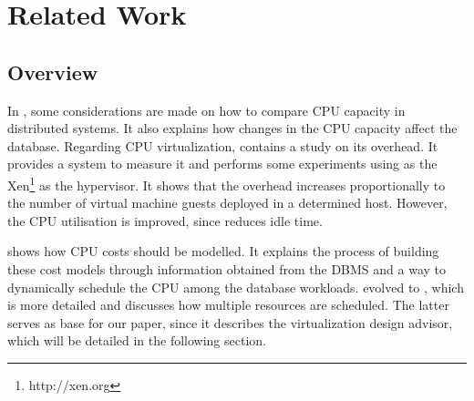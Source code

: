 \chapter{\textbf{Related Work}}

\section{Overview}


\label{chap:relwork}

In \cite{dias:automatic}, some considerations are made on how to compare CPU capacity in distributed systems. It also explains how changes in the CPU capacity affect the database. Regarding CPU virtualization, \cite{6127969} contains a study on its overhead. It provides a system to measure it and performs some experiments using as the Xen\footnote{http://xen.org} as the hypervisor. It shows that the overhead increases proportionally to the number of virtual machine guests deployed in a determined host. However, the CPU utilisation is improved, since reduces idle time. 

\cite{Soror:2008:AVM:1376616.1376711-OLD} shows how CPU costs should be modelled. It explains the process of building these cost models through information obtained from the DBMS and a way to dynamically schedule the CPU among the database workloads. \cite{Soror:2008:AVM:1376616.1376711-OLD} evolved to \cite{Soror:2008:AVM:1376616.1376711}, which is more detailed and discusses how multiple resources are scheduled. The latter serves as base for our paper, since it describes the virtualization design advisor, which will be detailed in the following section.

